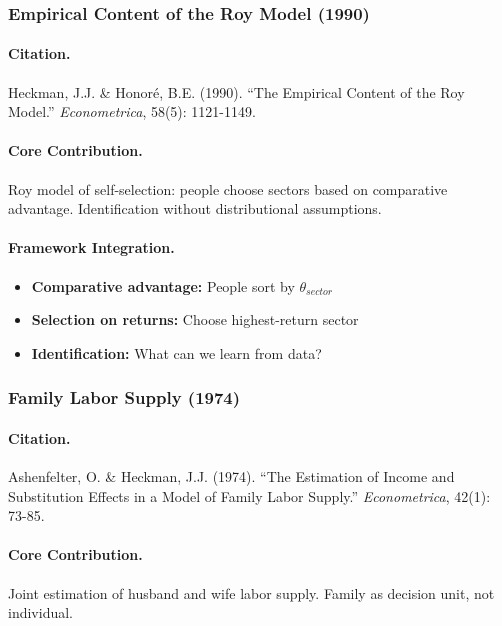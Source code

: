 \documentclass[12pt,a4paper]{article}
\begin{document}
\subsubsection{Empirical Content of the Roy Model (1990)}

\paragraph{Citation.}
Heckman, J.J. \& Honor\'e, B.E. (1990). ``The Empirical Content of the
Roy Model.'' \emph{Econometrica}, 58(5): 1121-1149.

\paragraph{Core Contribution.}
Roy model of self-selection: people choose sectors based on
comparative advantage. Identification without distributional assumptions.

\paragraph{Framework Integration.}
\begin{itemize}
  \item \textbf{Comparative advantage:} People sort by $\theta_{sector}$
  \item \textbf{Selection on returns:} Choose highest-return sector
  \item \textbf{Identification:} What can we learn from data?
\end{itemize}

\subsubsection{Family Labor Supply (1974)}

\paragraph{Citation.}
Ashenfelter, O. \& Heckman, J.J. (1974). ``The Estimation of Income and
Substitution Effects in a Model of Family Labor Supply.''
\emph{Econometrica}, 42(1): 73-85.

\paragraph{Core Contribution.}
Joint estimation of husband and wife labor supply. Family as
decision unit, not individual.
\end{document}
